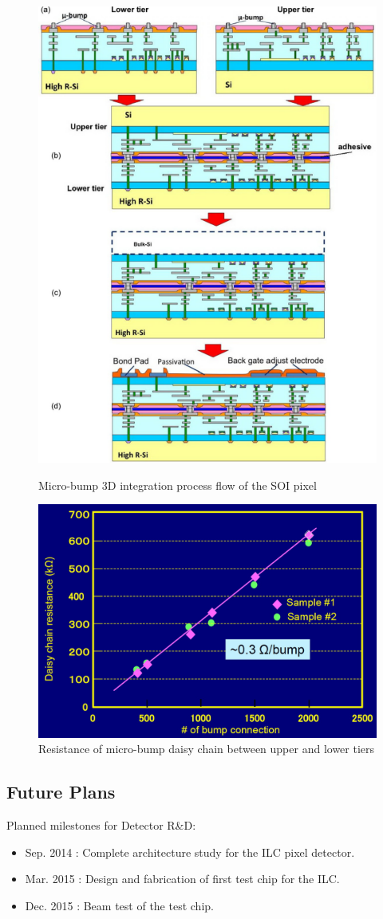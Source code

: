 \begin{figure}
	\begin{minipage}{0.35\textwidth}
		\centering
   		\includegraphics*[width=.5\textwidth,keepaspectratio]{VertexDetector/SOI/microBump3DIntegration}
		\caption{Micro-bump 3D integration process flow of the SOI pixel}
		\label{fig:VertexDetector:SOI:microbump3D}
 	\end{minipage}
 \hfill
 \begin{minipage}{0.64\textwidth}
 \centering
    \includegraphics*[width=\textwidth,keepaspectratio]{VertexDetector/SOI/BumpResistance.jpg}
	\caption{Resistance of micro-bump daisy chain between upper and lower tiers}
	\label{fig:VertexDetector:SOI:resistanceOfDaisyChain}
 \end{minipage}
 \end{figure}

\subsection{Future Plans}
Planned milestones for Detector R\&D:
\begin{itemize}
\item Sep. 2014 : Complete architecture study for the ILC pixel detector.
\item Mar. 2015 : Design and fabrication of first test chip for the ILC.
\item Dec. 2015 : Beam test of the test chip.
\end{itemize}
